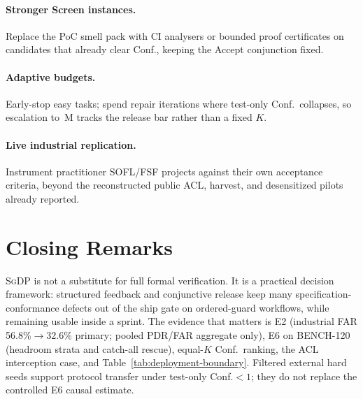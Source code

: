 \paragraph{Stronger Screen instances.}
Replace the PoC smell pack with CI analysers or bounded proof certificates on
candidates that already clear Conf., keeping the Accept conjunction fixed.

\paragraph{Adaptive budgets.}
Early-stop easy tasks; spend repair iterations where test-only Conf.\ collapses,
so escalation to~M tracks the release bar rather than a fixed $K$.

\paragraph{Live industrial replication.}
Instrument practitioner SOFL/FSF projects against their own acceptance
criteria, beyond the reconstructed public ACL, harvest, and desensitized
pilots already reported.


\section{Closing Remarks}
\label{sec:conc:closing}

\textsc{SgDP} is not a substitute for full formal verification.
It is a practical decision framework: structured feedback and conjunctive
release keep many specification-conformance defects out of the ship gate on
ordered-guard workflows, while remaining usable inside a sprint.
The evidence that matters is E2 (industrial FAR 56.8\%$\to$32.6\% primary;
pooled PDR/FAR aggregate only), E6 on BENCH-120 (headroom strata and
catch-all rescue), equal-$K$ Conf.\ ranking, the ACL interception case, and
Table~\ref{tab:deployment-boundary}.
Filtered external hard seeds support protocol transfer under test-only
Conf.${<}1$; they do not replace the controlled E6 causal estimate.

